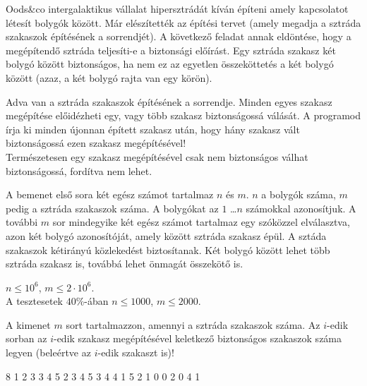 





Oods\&co intergalaktikus vállalat  hipersztrádát kíván építeni
amely kapcsolatot létesít bolygók között. Már elészítették az építési tervet (amely megadja a sztráda szakaszok építésének a sorrendjét). A következő feladat annak eldöntése, hogy a megépítendő sztráda teljesíti-e a biztonsági előírást. Egy sztráda szakasz két bolygó között biztonságos, ha nem ez az egyetlen összeköttetés a két bolygó között (azaz, a két bolygó rajta van egy körön). 


Adva van a sztráda szakaszok építésének a sorrendje. Minden egyes szakasz megépítése előidézheti egy, vagy több szakasz biztonságossá válását. A programod írja ki minden újonnan épített szakasz után, hogy hány szakasz vált biztonságossá ezen szakasz megépítésével!\\
Természetesen egy szakasz megépítésével csak nem biztonságos válhat biztonságossá, fordítva nem lehet.


A bemenet első sora két egész számot tartalmaz $n$ és $m$.
$n$ a bolygók száma, $m$ pedig a sztráda szakaszok száma.
A bolygókat az $1$ \dots $n$ számokkal azonosítjuk.
A további $m$ sor mindegyike két egész számot tartalmaz egy szóközzel elválasztva, azon két bolygó azonosítóját, amely között sztráda szakasz épül. A sztáda szakaszok kétirányú közlekedést biztosítanak. Két bolygó között lehet több sztráda szakasz is, továbbá lehet önmagát összekötő is.

\smallskip

 $n \leq 10^6$, $m \leq 2\cdot10^6$.\\
A tesztesetek $40\%$-ában $n \leq 1000$, $m \leq 2000$.

A kimenet $m$ sort tartalmazzon, amennyi a sztráda szakaszok száma. Az $i$-edik sorban az $i$-edik szakasz megépítésével keletkező biztonságos szakaszok száma legyen (beleértve az $i$-edik szakaszt is)!



 8
1 2
3 3
4 5
2 3
4 5
3 4
4 1
5 2
1
0
0
2
0
4
1
\sampleEND


 